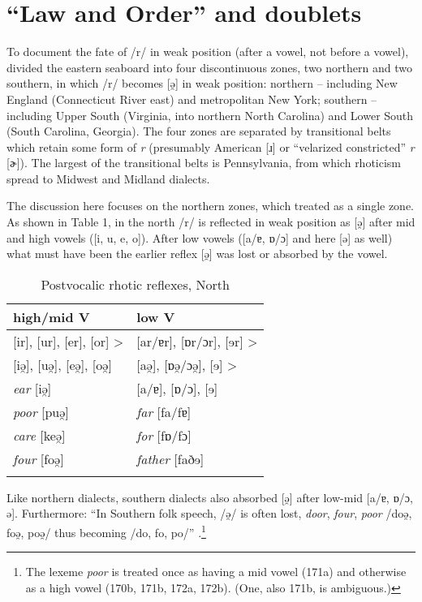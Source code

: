 \documentclass[output=paper,
modfonts
]{LSP/langsci}
\begin{document}
\section{{``Law and Order''} and  doublets}

To document the fate of /r/ in weak position (after a vowel, not before
a vowel), \citet{KUR} divided the eastern seaboard into
four discontinuous zones, two northern and two southern, in which /r/
becomes {[}ə̯{]} in weak position: northern -- including New England
(Connecticut River east) and metropolitan New York; southern -- including
Upper South (Virginia, into northern North Carolina) and Lower South
(South Carolina, Georgia). The four zones are separated by transitional
belts which retain some form of \emph{r} (presumably American {[}ɹ{]} or
``velarized constricted'' \emph{r} {[}ɚ{]}). The largest of the
transitional belts is Pennsylvania, from which rhoticism spread to
Midwest and Midland dialects.

The discussion here focuses on the northern zones, which \citet{KUR} treated as a single zone. As shown in Table 1, in the north /r/
is reflected in weak position as {[}ə̯{]} after mid and high vowels
({[}i, u, e, o{]}). After low vowels ({[}a/ɐ, ɒ/ɔ{]} and here {[}ə{]} as
well) what must have been the earlier reflex {[}ə̯{]} was lost or
absorbed by the vowel.

\begin{table}[ht]
\centering\caption{Postvocalic rhotic reflexes, North}
\begin{tabular}{ll}
\lsptoprule
high/mid V & low V\\
\midrule
{[}ir{]}, {[}ur{]}, {[}er{]}, {[}or{]} \textgreater{} &  [ar/ɐr], [ɒr/ɔr], [ɘr]
\textgreater{}\\
{[}iə̯{]}, {[}uə̯{]}, {[}eə̯{]}, {[}oə̯{]} & {[}aə̯{]}, {[}ɒə̯/ɔə̯{]}, {[}ɘ{]}
\textgreater{}\\
\emph{ear} {[}iə̯{]} & [a/ɐ], [ɒ/ɔ], [ɘ] \\
\emph{poor} {[}puə̯{]} & \emph{far} {[}fa/fɐ{]}\\
\emph{care} {[}keə̯{]} & \emph{for} {[}fɒ/fɔ{]}\\
\emph{four} {[}foə̯{]} & \emph{father} [faðɘ]\\
\lspbottomrule
\end{tabular}
\end{table}

\newpage 
Like northern dialects, southern dialects also absorbed {[}ə̯{]} after
low-mid [a/ɐ, ɒ/ɔ, ə]. Furthermore: ``In Southern folk speech, /ə̯/
is often lost, \emph{door}, \emph{four}, \emph{poor} /doə̯, foə̯, poə̯/
thus becoming /do, fo, po/'' \citep[171a and map \#156]{KUR}.\footnote{The
  lexeme \emph{poor} is treated once as having a mid vowel (171a) and
  otherwise as a high vowel (170b, 171b, 172a, 172b). (One, also 171b,
  is ambiguous.)}
\end{document}
